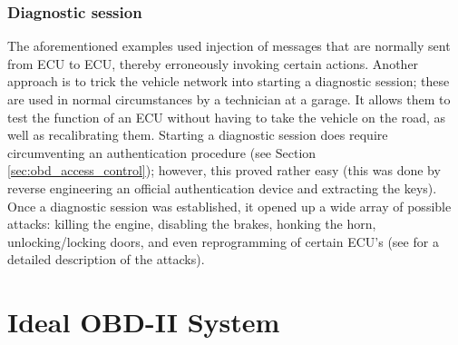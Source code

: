 \subsubsection{Diagnostic session} 
\label{subsubsec:diagnostic_session}

The aforementioned examples used injection of messages that are normally sent from ECU to ECU, thereby erroneously invoking certain actions. Another approach is to trick the vehicle network into starting a diagnostic session; these are used in normal circumstances by a technician at a garage. It allows them to test the function of an ECU without having to take the vehicle on the road, as well as recalibrating them. Starting a diagnostic session does require circumventing an authentication procedure (see Section \ref{sec:obd_access_control}); however, this proved rather easy (this was done by reverse engineering an official authentication device and extracting the keys). Once a diagnostic session was established, it opened up a wide array of possible attacks: killing the engine, disabling the brakes, honking the horn, unlocking/locking doors, and even reprogramming of certain ECU's (see \cite{MillerC} for a detailed description of the attacks).

\section{Ideal OBD-II System}
\label{sec:sol_RBAC}

